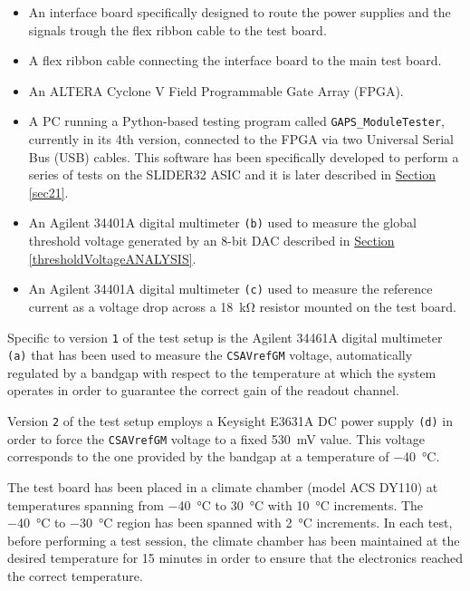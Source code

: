 \begin{itemize}
    \item An interface board specifically designed to route the power supplies and the signals trough the flex ribbon cable to the test board.
    \item A flex ribbon cable connecting the interface board to the main test board.
    \item An ALTERA Cyclone V Field Programmable Gate Array (FPGA).
    \item A PC running a Python-based testing program called \texttt{GAPS\_ModuleTester}, currently in its 4th version, connected to the FPGA via two Universal Serial Bus (USB) cables. This software has been specifically developed to perform a series of tests on the SLIDER32 ASIC and it is later described in \hyperref[sec21]{Section \ref{sec21}}.
    \item An Agilent 34401A digital multimeter \texttt{(b)} used to measure the global threshold voltage generated by an 8-bit DAC described in \hyperref[thresholdVoltageANALYSIS]{Section \ref{thresholdVoltageANALYSIS}}.
    \item An Agilent 34401A digital multimeter \texttt{(c)} used to measure the reference current as a voltage drop across a \SI{18}{\kilo\ohm} resistor mounted on the test board.
\end{itemize}

\par
Specific to version \texttt{1} of the test setup is the Agilent 34461A digital multimeter \texttt{(a)} that has been used to measure the \texttt{CSAVrefGM} voltage, automatically regulated by a bandgap with respect to the temperature at which the system operates in order to guarantee the correct gain of the readout channel.

\par
Version \texttt{2} of the test setup employs a Keysight E3631A DC power supply \texttt{(d)} in order to force the \texttt{CSAVrefGM} voltage to a fixed \SI{530}{\milli\volt} value. This voltage corresponds to the one provided by the bandgap at a temperature of \SI{-40}{\celsius}.

\par
The test board has been placed in a climate chamber (model ACS DY110) at temperatures spanning from \SI{-40}{\celsius} to \SI{30}{\celsius} with \SI{10}{\celsius} increments. The \SI{-40}{\celsius} to \SI{-30}{\celsius} region has been spanned with \SI{2}{\celsius} increments. In each test, before performing a test session, the climate chamber has been maintained at the desired temperature for 15 minutes in order to ensure that the electronics reached the correct temperature.

